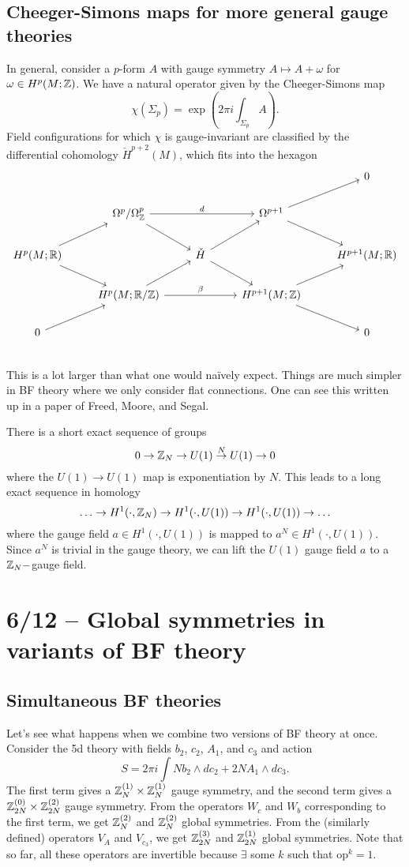 \subsection{Cheeger-Simons maps for more general gauge theories}

In general, consider a $p$-form $A$ with gauge symmetry $A \mapsto A + \omega$ for $\omega \in H^p(M; \mathbb{Z})$.
We have a natural operator given by the Cheeger-Simons map
\[
	\chi(\Sigma_p) = \exp\left(2\pi i \int_{\Sigma_p} A\right).
\]
Field configurations for which $\chi$ is gauge-invariant are classified by the differential cohomology $\check{H}^{p+2}(M)$, which fits into the hexagon
\[
	\begin{tikzcd}
		& & & & 0 \\
		& \Omega^p / \Omega^p_{\ZZ} \ar[rr, "d"] \ar[dr] & & \Omega^{p+1} \ar[ur] \ar[dr] & \\
		H^p(M; \RR) \ar[ur] \ar[dr] & & \check{H} \ar[ur] \ar[dr] & & H^{p+1}(M; \RR) \\
		& H^p(M; \RR / \ZZ) \ar[rr, "\beta"] \ar[ur] & & H^{p+1}(M; \ZZ) \ar[ur] \ar[dr] & \\
		0 \ar[ur] & & & & 0 \\
	\end{tikzcd}
\]
This is a lot larger than what one would na\"ively expect.
Things are much simpler in BF theory where we only consider flat connections.
One can see this written up in a paper of Freed, Moore, and Segal.

There is a short exact sequence of groups
\[
	0 \to \mathbb{Z}_N \to U(1) \overset N \to U(1) \to 0 
\]
where the $U(1) \to U(1)$ map is exponentiation by $N$. This leads to a long exact sequence in homology
\[
	\ldots \to H^1(\cdot, \mathbb{Z}_N) \to H^1(\cdot, U(1)) \to H^1(\cdot, U(1)) \to \ldots
\]
where the gauge field $a \in H^1(\cdot, U(1))$ is mapped to $a^N \in H^1(\cdot, U(1))$. Since $a^N$ is trivial in the gauge theory, we can lift the $U(1)$ gauge field $a$ to a $\mathbb{Z}_N-$gauge field.

\section{6/12 -- Global symmetries in variants of BF theory}

\subsection{Simultaneous BF theories}

Let's see what happens when we combine two versions of BF theory at once.
Consider the 5d theory with fields $b_2$, $c_2$, $A_1$, and $c_3$ and action
\[
	S = 2 \pi i \int N b_2 \wedge dc_2 + 2N A_1 \wedge dc_3.
\]
The first term gives a $\mathbb{Z}_N^{(1)} \times \mathbb{Z}_N^{(1)}$ gauge symmetry, and the second term gives a $\mathbb{Z}_{2N}^{(0)} \times \mathbb{Z}_{2N}^{(2)}$ gauge symmetry.
From the operators $W_c$ and $W_b$ corresponding to the first term, we get $\mathbb{Z}_N^{(2)}$ and $\mathbb{Z}_N^{(2)}$ global symmetries.
From the (similarly defined) operators $V_A$ and $V_{c_3}$, we get $\mathbb{Z}_{2N}^{(3)}$ and $\mathbb{Z}_{2N}^{(1)}$ global symmetries.
Note that so far, all these operators are invertible because $\exists$ some $k$ such that $\mathrm{op}^k = 1$.

